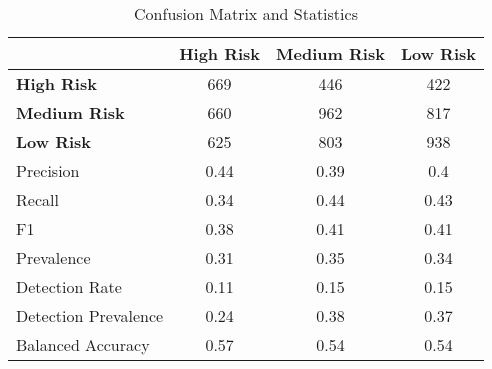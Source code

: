 \begin{table}[!htbp]
    \small
    \centering
    \caption{Confusion Matrix and Statistics}
    \label{tab:confusion}
    \begin{tabular}{lccc}
        \toprule
        & \textbf{High Risk} & \textbf{Medium Risk} & \textbf{Low Risk} \\
        \midrule
        \textbf{High Risk} & 669 & 446 & 422 \\
        \textbf{Medium Risk} & 660 & 962 & 817 \\
        \textbf{Low Risk} & 625 & 803 & 938 \\
        \bottomrule
        \midrule
        Precision & 0.44 & 0.39 & 0.4 \\
        Recall & 0.34 & 0.44 & 0.43 \\
        F1 & 0.38 & 0.41 & 0.41 \\
        Prevalence & 0.31 & 0.35 & 0.34 \\
        Detection Rate & 0.11 & 0.15 & 0.15 \\
        Detection Prevalence & 0.24 & 0.38 & 0.37 \\
        Balanced Accuracy & 0.57 & 0.54 & 0.54 \\
        \bottomrule
    \end{tabular}
\end{table}